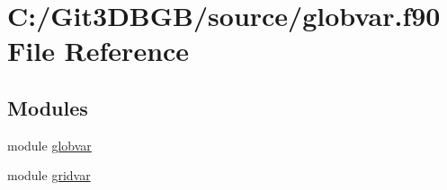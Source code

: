 \hypertarget{globvar_8f90}{}\section{C\+:/\+Git3\+D\+B\+G\+B/source/globvar.f90 File Reference}
\label{globvar_8f90}
\subsection*{Modules}
\begin{DoxyCompactItemize}
\item 
module \hyperlink{namespaceglobvar}{globvar}
\item 
module \hyperlink{namespacegridvar}{gridvar}
\end{DoxyCompactItemize}
